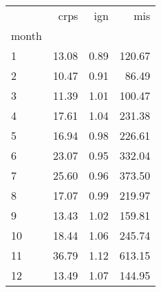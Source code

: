\begin{tabular}{lrrr}
\toprule
 & crps & ign & mis \\
month &  &  &  \\
\midrule
1 & 13.08 & 0.89 & 120.67 \\
2 & 10.47 & 0.91 & 86.49 \\
3 & 11.39 & 1.01 & 100.47 \\
4 & 17.61 & 1.04 & 231.38 \\
5 & 16.94 & 0.98 & 226.61 \\
6 & 23.07 & 0.95 & 332.04 \\
7 & 25.60 & 0.96 & 373.50 \\
8 & 17.07 & 0.99 & 219.97 \\
9 & 13.43 & 1.02 & 159.81 \\
10 & 18.44 & 1.06 & 245.74 \\
11 & 36.79 & 1.12 & 613.15 \\
12 & 13.49 & 1.07 & 144.95 \\
\bottomrule
\end{tabular}
